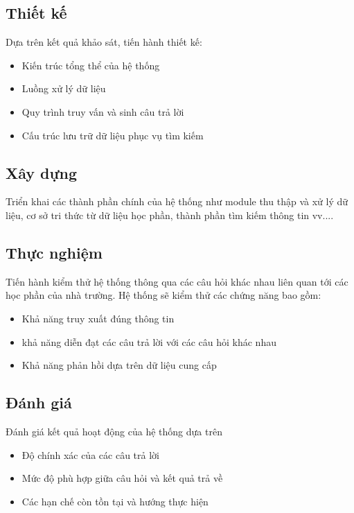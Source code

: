 \documentclass[../DoAn.tex]{subfiles}
\begin{document}
\subsection{Thiết kế}
Dựa trên kết quả khảo sát, tiến hành thiết kế:
\begin{itemize}
    \item Kiến trúc tổng thể của hệ thống 
    \item Luồng xử lý dữ liệu
    \item Quy trình truy vấn và sinh câu trả lời
    \item Cấu trúc lưu trữ dữ liệu phục vụ tìm kiếm
\end{itemize}

\subsection{Xây dựng}
Triển khai các thành phần chính của hệ thống như module thu thập và xử lý dữ liệu, cơ sở tri thức từ dữ liệu học phần, thành phần tìm kiếm thông tin vv....
\subsection{Thực nghiệm}
Tiến hành kiểm thử hệ thống thông qua các câu hỏi khác nhau liên quan tới các học phần của nhà trường. Hệ thống sẽ kiểm thử các chứng năng bao gồm:
\begin{itemize}
    \item Khả năng truy xuất đúng thông tin
    \item khả năng diễn đạt các câu trả lời với các câu hỏi khác nhau
    \item Khả năng phản hồi dựa trên dữ liệu cung cấp
\end{itemize}
\subsection{Đánh giá}
Đánh giá kết quả hoạt động của hệ thống dựa trên
\begin{itemize}
    \item Độ chính xác của các câu trả lời
    \item Mức độ phù hợp giữa câu hỏi và kết quả trả về
    \item Các hạn chế còn tồn tại và hướng thực hiện
\end{itemize}
\end{document}
